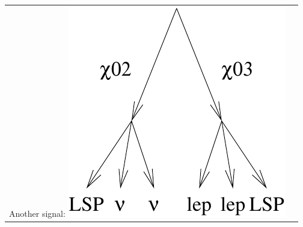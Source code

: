 \documentclass[landscape]{article}
\begin{document}
\begin{center}
\begin{tabular}{p{\textheight} p{4 cm}}
\begin{minipage}{4.5 cm}
      \vspace{1 cm}
      Another signal:
      \includegraphics[width=\linewidth]{two_leptons_signal2.pdf}
    \end{minipage}
  \end{tabular}
\end{center}
\end{document}
